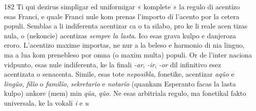 \begin{VUpage}[186]{182}
Ti qui dezirus simpligar ed uniformigar « komplete »\nl
la regulo di acentizo esas Franci, e quale Franci nule kom\cc
prenas l'importo di l'acento por la cetera populi. Semblas\nl
a li indiferenta acentizar ca o ta silabo, pro ke li reale acen\cc
tizas nula, o (nekoncie) acentizas \textit{sempre la lasta}. Ico esas\nl
grava kulpo e danjeroza eroro. L'acentizo maxime importas,\nl
ne nur a la beleso e harmonio di nia linguo, ma a lua kom\cc
prenebleso por omna (o maxim multa) populi. Or de l'inter\cc
naciona vidpunto, esas nule indiferenta, ke la finali \textit{-ar}, \textit{-ir},\nl
\textit{-or} dil infinitivo esez acentizata o senacenta. Simile, esas\nl
tote \textit{neposibla}, fonetike, acentizar \textit{aqûo} e \textit{lingûo}, \textit{filîo} o\nl
\textit{familîo}, \textit{sekretarîo} e \textit{notarîo} (quankam Esperanto facas la\nl
lasta kulpo) ankore (mem) min \textit{qûa}, \textit{qûo}. Ne esas arbitriala\nl
regulo, ma fonetikal fakto universala, ke la vokali \textit{i} e \textit{u}\nl
\end{VUpage}

